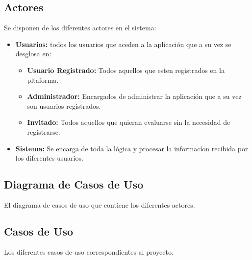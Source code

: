 \subsection{Actores}
Se disponen de los diferentes actores en el sistema:
\begin{itemize}
    \item \textbf{Usuarios:} todos los usuarios que aceden a la aplicación que a su vez se desglosa en:
    \begin{itemize}
        \item \textbf{Usuario Registrado:} Todos aquellos que esten registrados en la pltaforma.
        \item \textbf{Administrador:} Encargados de administrar la aplicación que a su vez son usuarios registrados.
        \item \textbf{Invitado:} Todos aquellos que quieran evaluarse sin la necesidad de registrarse.
    \end{itemize}
    \item \textbf{Sistema:} Se encarga de toda la lógica y procesar la informacíon recibida por los diferentes usuarios.
\end{itemize}

\subsection{Diagrama de Casos de Uso}
El diagrama de casos de uso que contiene los diferentes actores.


\subsection{Casos de Uso}
Los diferentes casos de uso correspondientes al proyecto.

